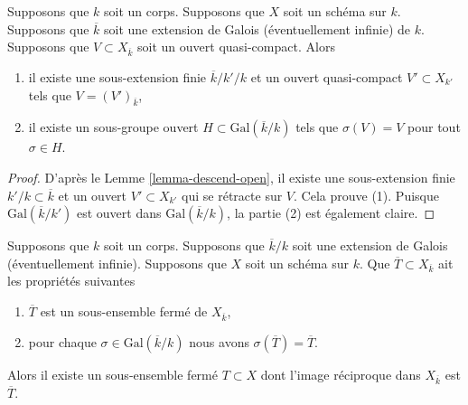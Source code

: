 \begin{lemma}
\label{lemma-Galois-action-quasi-compact-open}
Supposons que $k$ soit un corps. Supposons que $X$ soit un
schéma sur $k$. Supposons que $\overline{k}$ soit une
extension de Galois (éventuellement infinie) de $k$. Supposons que
$V \subset X_{\overline{k}}$ soit un ouvert quasi-compact. Alors
\begin{enumerate}
\item il existe une sous-extension finie
$\overline{k}/k'/k$ et un ouvert quasi-compact $V'
\subset X_{k'}$ tels que $V = (V')_{\overline{k}}$, \item il
existe un sous-groupe ouvert $H \subset
\text{Gal}(\overline{k}/k)$ tels que $\sigma(V) = V$ pour tout $\sigma \in H$.
\end{enumerate}
\end{lemma}

\begin{proof}
D'après le Lemme \ref{lemma-descend-open}, il existe une sous-extension
finie $k'/k \subset \overline{k}$ et un ouvert $V' \subset X_{k'}$ qui se
rétracte sur $V$. Cela prouve (1). Puisque $\text{Gal}(\overline{k}/k')$ est
ouvert dans $\text{Gal}(\overline{k}/k)$, la partie (2) est également claire.
\end{proof}

\begin{lemma}
\label{lemma-closed-fixed-by-Galois}
Supposons que $k$ soit un corps. Supposons que $\overline{k}/k$ soit une
extension de Galois (éventuellement infinie). Supposons que $X$ soit un schéma
sur $k$. Que $\overline{T} \subset X_{\overline{k}}$ ait les propriétés suivantes
\begin{enumerate}
\item $\overline{T}$ est un sous-ensemble fermé de
$X_{\overline{k}}$, \item pour chaque $\sigma \in
\text{Gal}(\overline{k}/k)$ nous avons $\sigma(\overline{T}) = \overline{T}$.
\end{enumerate}
Alors il existe un sous-ensemble fermé $T \subset X$ dont
l'image réciproque dans $X_{\overline{k}}$ est $\overline{T}$.
\end{lemma}

